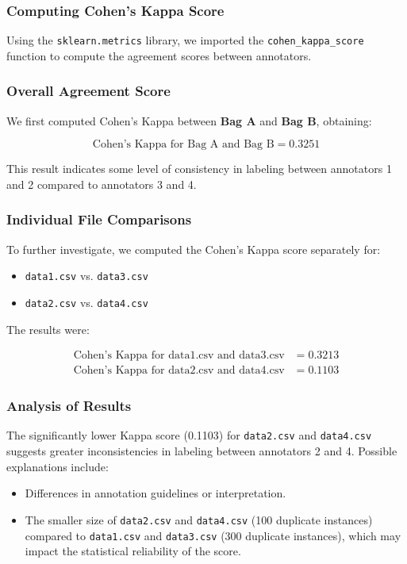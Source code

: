 \documentclass{article}
\begin{document}
\subsubsection*{Computing Cohen's Kappa Score}

Using the \texttt{sklearn.metrics} library, we imported the \texttt{cohen\_kappa\_score} function to compute the agreement scores between annotators.

\subsubsection*{Overall Agreement Score}
We first computed Cohen’s Kappa between \textbf{Bag A} and \textbf{Bag B}, obtaining:

\begin{equation}
    \text{Cohen's Kappa for Bag A and Bag B} = 0.3251
\end{equation}

\noindent
This result indicates some level of consistency in labeling between annotators 1 and 2 compared to annotators 3 and 4.

\subsubsection*{Individual File Comparisons}
To further investigate, we computed the Cohen’s Kappa score separately for:
\begin{itemize}
    \item \texttt{data1.csv} vs. \texttt{data3.csv}
    \item \texttt{data2.csv} vs. \texttt{data4.csv}
\end{itemize}

The results were:

\begin{align}
    \text{Cohen's Kappa for data1.csv and data3.csv} &= 0.3213 \\
    \text{Cohen's Kappa for data2.csv and data4.csv} &= 0.1103
\end{align}

\subsubsection*{Analysis of Results}

The significantly lower Kappa score (0.1103) for \texttt{data2.csv} and \texttt{data4.csv} suggests greater inconsistencies in labeling between annotators 2 and 4. Possible explanations include:
\begin{itemize}
    \item Differences in annotation guidelines or interpretation.
    \item The smaller size of \texttt{data2.csv} and \texttt{data4.csv} (100 duplicate instances) compared to \texttt{data1.csv} and \texttt{data3.csv} (300 duplicate instances), which may impact the statistical reliability of the score.
\end{itemize}
\end{document}

